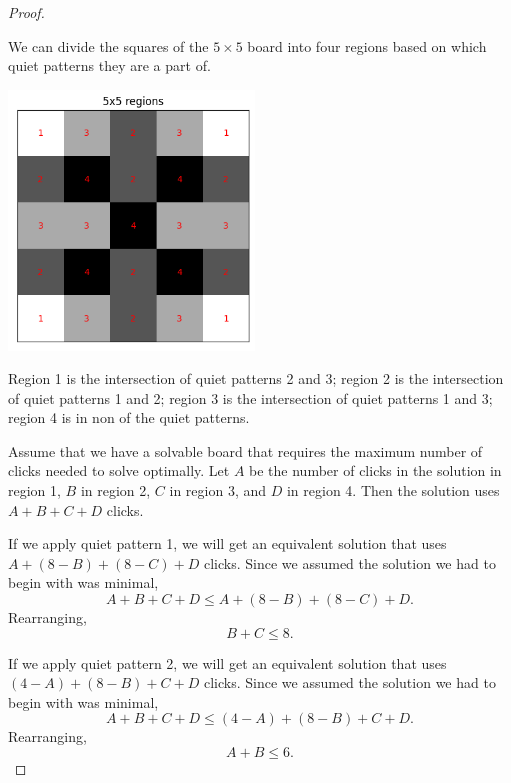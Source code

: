 \documentclass{article}
\begin{document}
\begin{proof}
\begin{center}
		\end{center}
		We can divide the squares of the $5 \times 5$ board into four regions based on which quiet patterns they are a part of.
		\begin{center}
			\includegraphics[width=0.49\textwidth]{../../code/serialization/regions/5x5_regions.png}
		\end{center}
		Region 1 is the intersection of quiet patterns 2 and 3; region 2 is the intersection of quiet patterns 1 and 2; region 3 is the intersection of quiet patterns 1 and 3;
		region 4 is in non of the quiet patterns.
		
		Assume that we have a solvable board that requires the maximum number of clicks needed to solve optimally.
		Let $A$ be the number of clicks in the solution in region 1, $B$ in region 2, $C$ in region 3, and $D$ in region 4.
		Then the solution uses $A + B + C + D$ clicks.
		
		If we apply quiet pattern 1, we will get an equivalent solution that uses $A + (8 - B) + (8 - C) + D$ clicks.
		Since we assumed the solution we had to begin with was minimal,
		\begin{equation*}
			A + B + C + D \leq A + (8 - B) + (8 - C) + D.
		\end{equation*}
		Rearranging,
		\begin{equation}
			B + C \leq 8.
		\end{equation}
	
		If we apply quiet pattern 2, we will get an equivalent solution that uses $(4 - A) + (8 - B) + C + D$ clicks.
		Since we assumed the solution we had to begin with was minimal,
		\begin{equation*}
			A + B + C + D \leq (4 - A) + (8 - B) + C + D.
		\end{equation*}
		Rearranging,
		\begin{equation}
			A + B \leq 6.
		\end{equation}
	

\end{proof}
\end{document}
